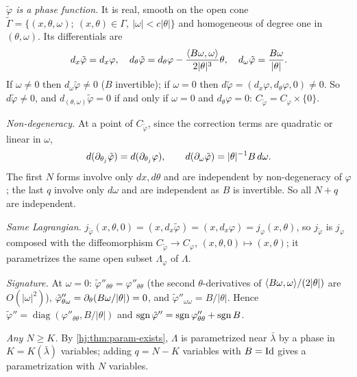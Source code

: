 \emph{$\tilde\varphi$ is a phase function.} It is real, smooth on the open cone $\tilde\Gamma=
\{(x,\theta,\omega);\ (x,\theta)\in\Gamma,\ |\omega|<c|\theta|\}$ and homogeneous of degree one
in $(\theta,\omega)$. Its differentials are
\begin{equation*}
d_x\tilde\varphi=d_x\varphi,\quad d_\theta\tilde\varphi=d_\theta\varphi-\frac{\langle B\omega,\omega\rangle}
{2|\theta|^3}\theta,\quad d_\omega\tilde\varphi=\frac{B\omega}{|\theta|}.
\end{equation*}
If $\omega\ne0$ then $d_\omega\tilde\varphi\ne0$ ($B$ invertible); if $\omega=0$ then
$d\tilde\varphi=(d_x\varphi,d_\theta\varphi,0)\ne0$. So $d\tilde\varphi\ne0$, and
$d_{(\theta,\omega)}\tilde\varphi=0$ if and only if $\omega=0$ and $d_\theta\varphi=0$:
$C_{\tilde\varphi}=C_\varphi\times\{0\}$.

\emph{Non-degeneracy.} At a point of $C_{\tilde\varphi}$, since the correction terms are
quadratic or linear in $\omega$,
\begin{equation*}
d(\partial_{\theta_j}\tilde\varphi)=d(\partial_{\theta_j}\varphi),\qquad
d(\partial_{\omega}\tilde\varphi)=|\theta|^{-1}B\,d\omega .
\end{equation*}
The first $N$ forms involve only $dx,d\theta$ and are independent by non-degeneracy of
$\varphi$; the last $q$ involve only $d\omega$ and are independent as $B$ is invertible. So
all $N+q$ are independent.

\emph{Same Lagrangian.} $j_{\tilde\varphi}(x,\theta,0)=(x,d_x\tilde\varphi)=(x,d_x\varphi)=
j_\varphi(x,\theta)$, so $j_{\tilde\varphi}$ is $j_\varphi$ composed with the diffeomorphism
$C_{\tilde\varphi}\to C_\varphi$, $(x,\theta,0)\mapsto(x,\theta)$; it parametrizes the same
open subset $\Lambda_\varphi$ of $\Lambda$.

\emph{Signature.} At $\omega=0$: $\tilde\varphi''_{\theta\theta}=\varphi''_{\theta\theta}$ (the
second $\theta$-derivatives of $\langle B\omega,\omega\rangle/(2|\theta|)$ are $O(|\omega|^2)$),
$\tilde\varphi''_{\theta\omega}=\partial_\theta(B\omega/|\theta|)=0$, and
$\tilde\varphi''_{\omega\omega}=B/|\theta|$. Hence $\tilde\varphi''=\operatorname{diag}
(\varphi''_{\theta\theta},B/|\theta|)$ and $\operatorname{sgn}\tilde\varphi''=\operatorname{sgn}\varphi''_{\theta\theta}+
\operatorname{sgn} B$.

\emph{Any $N\ge K$.} By \cref{hj:thm:param-exists}, $\Lambda$ is parametrized near
$\bar\lambda$ by a phase in $K=K(\bar\lambda)$ variables; adding $q=N-K$ variables with $B=\operatorname{Id}$
gives a parametrization with $N$ variables.

